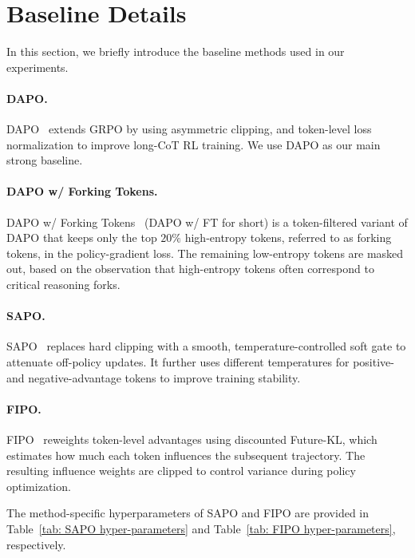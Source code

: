 \documentclass{article} %
\begin{document}
\section{Baseline Details}
\label{app:baseline-details}

In this section, we briefly introduce the baseline methods used in our experiments.

\paragraph{DAPO.}
DAPO~\citep{yu2025dapo} extends GRPO by using asymmetric clipping, and token-level loss normalization to improve long-CoT RL training. We use DAPO as our main strong baseline.

\paragraph{DAPO w/ Forking Tokens.}
DAPO w/ Forking Tokens~\citep{wang2025beyond} (DAPO w/ FT for short) is a token-filtered variant of DAPO that keeps only the top \(20\%\) high-entropy tokens, referred to as forking tokens, in the policy-gradient loss. 
The remaining low-entropy tokens are masked out, based on the observation that high-entropy tokens often correspond to critical reasoning forks.

\paragraph{SAPO.}
SAPO~\citep{gao2025soft} replaces hard clipping with a smooth, temperature-controlled soft gate to attenuate off-policy updates. 
It further uses different temperatures for positive- and negative-advantage tokens to improve training stability.

\paragraph{FIPO.}
FIPO~\citep{ma2026fipo} reweights token-level advantages using discounted Future-KL, which estimates how much each token influences the subsequent trajectory. 
The resulting influence weights are clipped to control variance during policy optimization.

The method-specific hyperparameters of SAPO and FIPO are provided in Table~\ref{tab: SAPO hyper-parameters} and Table~\ref{tab: FIPO hyper-parameters}, respectively.
\end{document}
